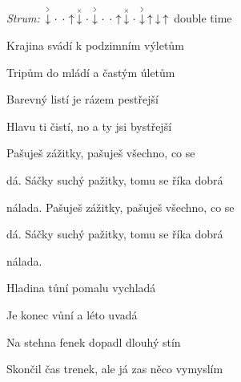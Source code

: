 \begin{song}


\begin{headerbox}
\RaiseBoxWithAccents
\textit{Strum:} $\AccentDown\Miss\Miss\Up\ChuckDown\Miss\AccentDown\Miss\Miss\Up\ChuckDown\Miss\AccentDown\Up\Down\Up$ double time
\end{headerbox}

\begin{vchordbox}
\end{vchordbox}

\Large

\bigskip

\Intro
{}    \par

\bigskip

Krajina svádí k podzimním výletům \par
Tripům do mládí a častým úletům \par
Barevný listí je rázem pestřejší \par
Hlavu ti čistí, no a ty jsi bystřejší \par

\bigskip

 Pašuješ zážitky, pašuješ všechno, co se \par
{}dá. Sáčky suchý pažitky, tomu se říka dobrá \par
nálada. Pašuješ zážitky, pašuješ všechno, co se \par
{}dá. Sáčky suchý pažitky, tomu se říka dobrá \par
nálada.    \par

\bigskip

Hladina tůní pomalu vychladá \par
Je konec vůní a léto uvadá \par
Na stehna fenek dopadl dlouhý stín \par
Skončil čas trenek, ale já zas něco vymyslím \par

\bigskip


\end{song}
